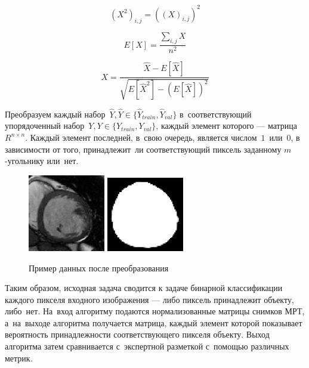\begin{equation}
\label{eq:input_squared}
(X^{2})_{i,j}=((X)_{i,j})^{2}
\end{equation}

\begin{equation}
\label{eq:input_expected_value}
E[X]=\frac{
  \sum_{i,j}X
}{
  n^{2}
}
\end{equation} 

\begin{equation}
\label{eq:input_normalized}
X = \frac{
  \hat{X} - E[\hat{X}]
}{\sqrt{
  E[\hat{X}^{2}] - (E[\hat{X}])^2
}}
\end{equation}

Преобразуем каждый набор~$\hat{Y},\hat{Y}\in{}\{\hat{Y}_{train},\hat{Y}_{val}\}$ 
в~соответствующий упорядоченный набор~$Y,Y\in{}\{Y_{train},Y_{val}\}$, 
каждый элемент которого — матрица~$R^{n\times{}n}$. Каждый элемент последней, 
в~свою очередь, является числом~$1$~или~$0$, в зависимости от того, принадлежит~ли 
соответствующий пиксель заданному \mbox{$m$-угольнику} или~нет.

\begin{figure}[hb]
  \begin{center}
    \includegraphics[width=0.3\textwidth,keepratio]{img/example-in}
    \includegraphics[width=0.3\textwidth,keepratio]{img/example-out}
  \end{center}
  \caption{Пример данных после преобразования}
\end{figure}

Таким образом, исходная задача сводится к задаче бинарной классификации каждого пикселя 
входного изображения — либо пиксель принадлежит объекту, либо~нет. На~вход алгоритму 
подаются нормализованные матрицы снимков МРТ, а~на~выходе алгоритма получается матрица, 
каждый элемент которой показывает вероятность принадлежности соответствующего пикселя объекту. 
Выход алгоритма затем сравнивается с~экспертной разметкой с~помощью различных метрик.

